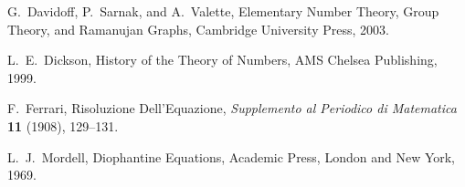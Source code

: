 \documentclass[12pt]{article}
\numberwithin{equation}{section}
\begin{document}
\begin{landscape}
{{\newpage




\newcommand{\journal}[6]{{\sc #1,} #2, {\it #3} {\bf #4} (#5), #6.}
\newcommand{\journalfive}[5]{{\sc #1,} #2, {\it #3}  (#4), #5.}
\newcommand{\preprint}[3]{{\sc #1,} #2, preprint #3.}
\newcommand{\book}[4]{{\sc #1,} #2, #3, #4.}
\newcommand{\collection}[6]{{\sc #1,}  #2, #3, in {\it #4}, #5, #6.}
\newcommand{\JCTA}{J.\ Combin.\ Theory Ser.\ A}
\newcommand{\arxiv}[3]{{\sc #1,} #2, {\tt #3}.}
\newcommand{\article}[3]{{\sc #1,} #2, {\tt #3}.}




\begin{thebibliography}{1}




\book{G.\ Davidoff, P.\ Sarnak, and A.\ Valette}
         {Elementary Number Theory,
           Group Theory,
           and Ramanujan Graphs}
         {Cambridge University Press}
         {2003}

\book{L.\ E.\ Dickson}
         {History of the Theory of Numbers}
         {AMS Chelsea Publishing}
         {1999}




\journal{F.\ Ferrari}
        {Risoluzione Dell'Equazione}
        {Supplemento al Periodico di Matematica}
        {11}{1908}{129--131}



\book{L.\ J.\ Mordell}
         {Diophantine Equations}
         {Academic Press, London and New York} 
         {1969}


\end{thebibliography}








}%

}%
\end{landscape}
\end{document}

